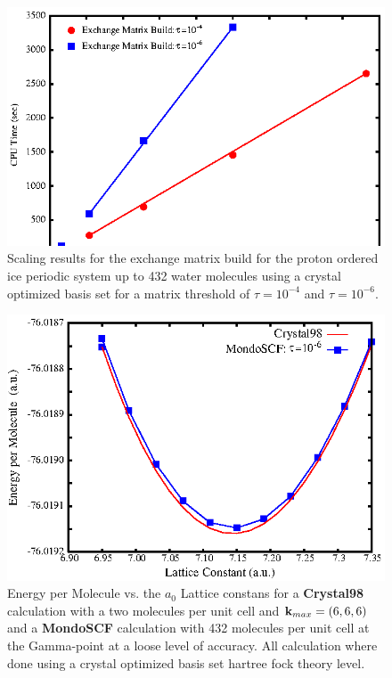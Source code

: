 \documentclass[prb,aps,nobibnotes,twocolumn,doublespace,twocolumngrid,superbib]{revtex4}
\begin{document}
%
%
%
\begin{figure}
\caption{Scaling results for the exchange matrix
build  for the proton ordered ice periodic system up to 432 water molecules 
using a crystal optimized basis set\cite{CBS:511G:H,CBS:861G:MgO} for a matrix threshold of 
$\tau=10^{-4}$ and  $\tau=10^{-6}$.}
\label{figure:Scaling_Matrix_Build_Ice}
{\centering \includegraphics{Timing_pIce_ONX_2.ps} \par} 
\end{figure}
%
%
%
\begin{figure}
\caption{Energy per Molecule vs. the $a_0$ Lattice constans for a {\bf Crystal98} calculation 
with a two molecules per unit cell and ${\bf k}_{max} = (6,6,6)$ and a {\bf MondoSCF} calculation 
with 432 molecules  per unit cell at the Gamma-point at a loose level of accuracy.
All calculation where done using a crystal optimized basis set\cite{CBS:511G:H,CBS:861G:MgO} 
hartree fock theory level. }
\label{figure:EnergyVsLattice_Ice}
{\centering \includegraphics{pIce_En_vs_a.ps} \par} 
\end{figure}
%
%
%
%
\end{document}
